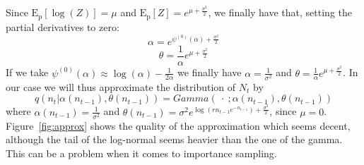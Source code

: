 \documentclass{article}
\begin{document}
Since $\mathrm{E_p}[\log(Z)]=\mu$ and $\mathrm{E_p}[Z] = e^{\mu+\frac{\sigma^2}{2}}$, we finally have that, setting the partial derivatives to zero:
\begin{equation*}
\alpha=e^{\psi^{(0)}(\alpha)+\frac{\sigma^2}{2}}
\end{equation*}
\begin{equation*}
\theta=\frac{1}{\alpha}e^{\mu+\frac{\sigma^2}{2}}
\end{equation*}
If we take $\psi^{(0)}(\alpha) \approx \log(\alpha)-\frac{1}{2\alpha}$ we finally have $\alpha =\frac{1}{\sigma^2}$ and $\theta=\frac{1}{\alpha}e^{\mu+\frac{\sigma^2}{2}}$.
In our case we will thus approximate the distribution of $N_t$ by
\begin{equation*}
q(n_t|\alpha(n_{t-1}), \theta(n_{t-1})) = Gamma(\ \cdot \ ; \alpha(n_{t-1}), \theta(n_{t-1}) )
\end{equation*}
where $ \alpha(n_{t-1})= \frac{1}{\sigma^2}$ and $\theta(n_{t-1})=\sigma^2e^{\log(rn_{t-1}e^{-n_{t-1}})+\frac{\sigma^2}{2}}$, since $\mu = 0$.\\
Figure~\ref{fig:approx} shows the quality of the approximation which seems decent, although the tail of the log-normal seems heavier than the one of the gamma. This can be a problem when it comes to importance sampling.
\end{document}
